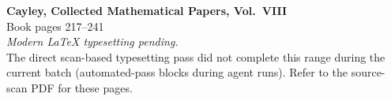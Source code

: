 \documentclass[11pt,a4paper]{article}
\begin{document}
\vspace*{2in}
\begin{center}
{\large\bfseries Cayley, Collected Mathematical Papers, Vol.~VIII}\\[1em]
{\large Book pages 217--241}\\[2em]
\textit{Modern LaTeX typesetting pending.}\\[1em]
The direct scan-based typesetting pass did not complete this range
during the current batch (automated-pass blocks during agent runs).
Refer to the source-scan PDF for these pages.
\end{center}
\end{document}
